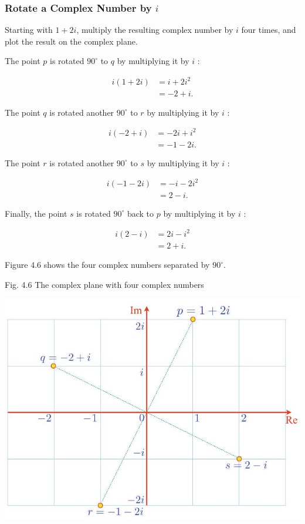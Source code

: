 \documentclass[10pt]{article}
\begin{document}
\subsubsection{Rotate a Complex Number by $i$}
Starting with $1+2 i$, multiply the resulting complex number by $i$ four times, and plot the result on the complex plane.

The point $p$ is rotated $90^{\circ}$ to $q$ by multiplying it by $i$ :

$$
\begin{aligned}
i(1+2 i) & =i+2 i^{2} \\
& =-2+i .
\end{aligned}
$$

The point $q$ is rotated another $90^{\circ}$ to $r$ by multiplying it by $i$ :

$$
\begin{aligned}
i(-2+i) & =-2 i+i^{2} \\
& =-1-2 i .
\end{aligned}
$$

The point $r$ is rotated another $90^{\circ}$ to $s$ by multiplying it by $i$ :

$$
\begin{aligned}
i(-1-2 i) & =-i-2 i^{2} \\
& =2-i .
\end{aligned}
$$

Finally, the point $s$ is rotated $90^{\circ}$ back to $p$ by multiplying it by $i$ :

$$
\begin{aligned}
i(2-i) & =2 i-i^{2} \\
& =2+i .
\end{aligned}
$$

Figure 4.6 shows the four complex numbers separated by $90^{\circ}$.

Fig. 4.6 The complex plane with four complex numbers

\begin{center}
\includegraphics[max width=\textwidth]{2023_04_20_41f1ceac5a31dc7d1b59g-078}
\end{center}
\end{document}
